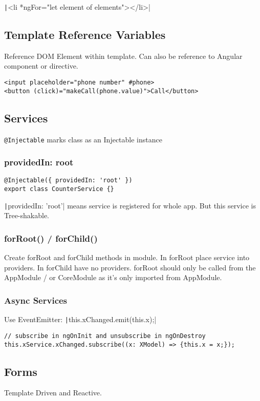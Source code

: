 \begin{multicols*}{2}
\texttt|<li *ngFor="let element of elements"></li>|


\subsection{Template Reference Variables}
Reference DOM Element within template. Can also be reference to Angular component or directive.
\begin{verbatim}
<input placeholder="phone number" #phone>
<button (click)="makeCall(phone.value)">Call</button>
\end{verbatim}

\subsection{Services}
\lstinline|@Injectable| marks class as an Injectable instance

\subsubsection{providedIn: root}
\begin{verbatim}
@Injectable({ providedIn: 'root' })
export class CounterService {}
\end{verbatim}
\texttt|{providedIn: 'root'}| means service is registered for whole app. But this service is Tree-shakable.

\subsubsection{forRoot() / forChild()}
Create forRoot and forChild methods in module. In forRoot place service into providers. In forChild have no providers. forRoot should only be called from the AppModule / or CoreModule as it's only imported from AppModule.
\subsubsection{Async Services}
Use EventEmitter: \texttt|this.xChanged.emit(this.x);|
\begin{verbatim}
// subscribe in ngOnInit and unsubscribe in ngOnDestroy
this.xService.xChanged.subscribe((x: XModel) => {this.x = x;});
\end{verbatim}

\subsection{Forms}
Template Driven and Reactive.


\end{multicols*}
